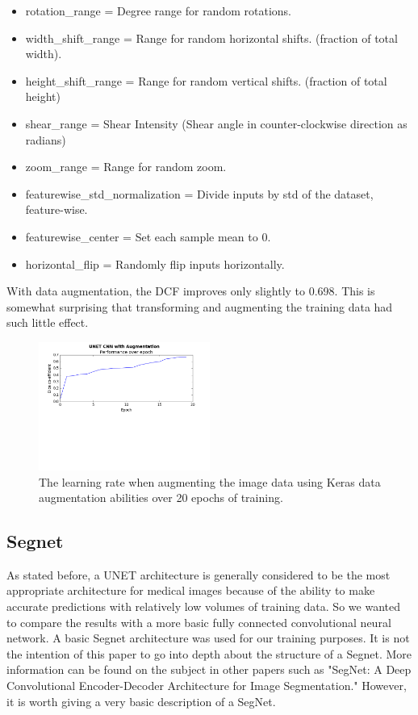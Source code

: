 \documentclass[letterpaper]{article}
\begin{document}
\begin{itemize}
  \item rotation\_range = Degree range for random rotations.
  \item width\_shift\_range =  Range for random horizontal shifts. (fraction of total width). 
  \item height\_shift\_range = Range for random vertical shifts. (fraction of total height)
  \item shear\_range = Shear Intensity (Shear angle in counter-clockwise direction as radians)
  \item zoom\_range = Range for random zoom.
  \item featurewise\_std\_normalization = Divide inputs by std of the dataset, feature-wise.
  \item featurewise\_center = Set each sample mean to 0.
  \item horizontal\_flip = Randomly flip inputs horizontally.
\end{itemize}

With data augmentation, the DCF improves only slightly to 0.698. This is somewhat surprising that transforming and augmenting the training data had such little effect.

 \begin{figure}[H]
  \centerline{\includegraphics[width=0.5\textwidth]{Plots/UNETSimple20Augmented.png}}
  \caption{The learning rate when augmenting the image data using Keras data augmentation abilities over 20 epochs of training.}
  \label{fig:unet3aug}
\end{figure}

\subsection{Segnet}
As stated before, a UNET architecture is generally considered to be the most appropriate architecture for medical images because of the ability to make accurate predictions with relatively low volumes of training data. So we wanted to compare the results with a more basic fully connected convolutional neural network. A basic Segnet architecture was used for our training purposes. It is not the intention of this paper to go into depth about the structure of a Segnet. More information can be found on the subject in other papers such as "SegNet: A Deep Convolutional Encoder-Decoder Architecture for Image Segmentation." \cite{badrinarayanan2015segnet} However, it is worth giving a very basic description of a SegNet. 
\end{document}
